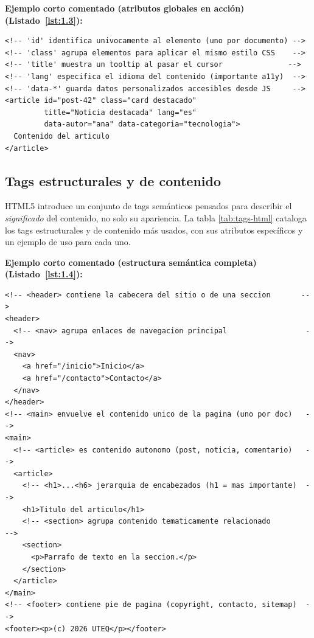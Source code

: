 \documentclass[11pt,a4paper,openany]{book}
\begin{document}
\textbf{Ejemplo corto comentado (atributos globales en acción) (Listado~\ref{lst:1.3}):}
\begin{lstlisting}[language=HTML5,numbers=none,caption={Ejemplo de HTML},label=lst:1.3]
<!-- 'id' identifica univocamente al elemento (uno por documento) -->
<!-- 'class' agrupa elementos para aplicar el mismo estilo CSS    -->
<!-- 'title' muestra un tooltip al pasar el cursor               -->
<!-- 'lang' especifica el idioma del contenido (importante a11y)  -->
<!-- 'data-*' guarda datos personalizados accesibles desde JS     -->
<article id="post-42" class="card destacado"
         title="Noticia destacada" lang="es"
         data-autor="ana" data-categoria="tecnologia">
  Contenido del articulo
</article>
\end{lstlisting}

\subsection{Tags estructurales y de contenido}

HTML5 introduce un conjunto de tags semánticos pensados para
describir el \emph{significado} del contenido, no solo su apariencia.
La tabla \ref{tab:tags-html} cataloga los tags estructurales y de contenido más usados, con sus atributos específicos y un ejemplo de uso para cada uno.

\textbf{Ejemplo corto comentado (estructura semántica completa) (Listado~\ref{lst:1.4}):}

\begin{lstlisting}[language=HTML5,numbers=none,caption={Ejemplo de HTML},label=lst:1.4]
<!-- <header> contiene la cabecera del sitio o de una seccion       -->
<header>
  <!-- <nav> agrupa enlaces de navegacion principal                  -->
  <nav>
    <a href="/inicio">Inicio</a>
    <a href="/contacto">Contacto</a>
  </nav>
</header>
<!-- <main> envuelve el contenido unico de la pagina (uno por doc)   -->
<main>
  <!-- <article> es contenido autonomo (post, noticia, comentario)   -->
  <article>
    <!-- <h1>...<h6> jerarquia de encabezados (h1 = mas importante)  -->
    <h1>Titulo del articulo</h1>
    <!-- <section> agrupa contenido tematicamente relacionado         -->
    <section>
      <p>Parrafo de texto en la seccion.</p>
    </section>
  </article>
</main>
<!-- <footer> contiene pie de pagina (copyright, contacto, sitemap)  -->
<footer><p>(c) 2026 UTEQ</p></footer>
\end{lstlisting}

\end{document}
